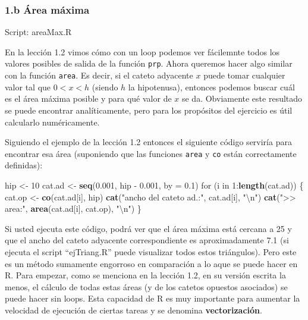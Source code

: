 \documentclass[]{article}
\newenvironment{Shaded}{}{}
\newcommand{\KeywordTok}[1]{\textcolor[rgb]{0.00,0.44,0.13}{\textbf{{#1}}}}
\newcommand{\DataTypeTok}[1]{\textcolor[rgb]{0.56,0.13,0.00}{{#1}}}
\newcommand{\DecValTok}[1]{\textcolor[rgb]{0.25,0.63,0.44}{{#1}}}
\newcommand{\FloatTok}[1]{\textcolor[rgb]{0.25,0.63,0.44}{{#1}}}
\newcommand{\CharTok}[1]{\textcolor[rgb]{0.25,0.44,0.63}{{#1}}}
\newcommand{\StringTok}[1]{\textcolor[rgb]{0.25,0.44,0.63}{{#1}}}
\newcommand{\NormalTok}[1]{{#1}}
\begin{document}
\subsubsection{1.b Área máxima}

Script: areaMax.R

En la lección 1.2 vimos cómo con un loop podemos ver fácilemnte todos
los valores posibles de salida de la función \texttt{prp}. Ahora
queremos hacer algo similar con la función \texttt{area}. Es decir, si
el cateto adyacente $x$ puede tomar cualquier valor tal que $0 < x < h$
(siendo $h$ la hipotenusa), entonces podemos buscar cuál es el área
máxima posible y para qué valor de $x$ se da. Obviamente este resultado
se puede encontrar analíticamente, pero para los propósitos del
ejercicio es útil calcularlo numéricamente.

Siguiendo el ejemplo de la lección 1.2 entonces el siguiente código
serviría para encontrar esa área (suponiendo que las funciones
\texttt{area} y \texttt{co} están correctamente definidas):

\begin{Shaded}
\begin{Highlighting}[]
\NormalTok{hip <- }\DecValTok{10}
\NormalTok{cat.ad <- }\KeywordTok{seq}\NormalTok{(}\FloatTok{0.001}\NormalTok{, hip - }\FloatTok{0.001}\NormalTok{, }\DataTypeTok{by =} \FloatTok{0.1}\NormalTok{)}
\NormalTok{for (i in }\DecValTok{1}\NormalTok{:}\KeywordTok{length}\NormalTok{(cat.ad)) \{}
    \NormalTok{cat.op <- }\KeywordTok{co}\NormalTok{(cat.ad[i], hip)}
    \KeywordTok{cat}\NormalTok{(}\StringTok{"ancho del cateto ad.:"}\NormalTok{, cat.ad[i], }\StringTok{"}\CharTok{\textbackslash{}n}\StringTok{"}\NormalTok{)}
    \KeywordTok{cat}\NormalTok{(}\StringTok{">> area:"}\NormalTok{, }\KeywordTok{area}\NormalTok{(cat.ad[i], cat.op), }\StringTok{"}\CharTok{\textbackslash{}n}\StringTok{"}\NormalTok{)}
\NormalTok{\}}
\end{Highlighting}
\end{Shaded}
Si usted ejecuta este código, podrá ver que el área máxima está cercana
a 25 y que el ancho del cateto adyacente correspondiente es
aproximadamente 7.1 (si ejecuta el script ``ejTriang.R'' puede
visualizar todos estos triángulos). Pero este es un método sumamente
engorroso en comparación a lo aque se puede hacer en R. Para empezar,
como se menciona en la lección 1.2, en su versión escrita la menos, el
cálculo de todas estas áreas (y de los catetos opuestos asociados) se
puede hacer sin loops. Esta capacidad de R es muy importante para
aumentar la velocidad de ejecución de ciertas tareas y se denomina
\textbf{vectorización}.
\end{document}
